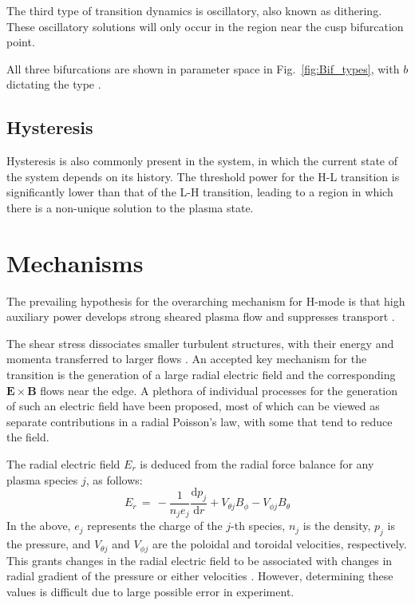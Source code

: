 The third type of transition dynamics is oscillatory, also known as dithering.
These oscillatory solutions will only occur in the region near the cusp bifurcation point.

All three bifurcations are shown in parameter space in Fig.~\ref{fig:Bif_types}, with $b$ dictating the type \cite{weymiens_bifurcation_2014}.

\subsection{Hysteresis}
Hysteresis is also commonly present in the system, in which the current state of the system depends on its history.
The threshold power for the H-L transition is significantly lower than that of the L-H transition, leading to a region in which there is a non-unique solution to the plasma state.


\section{Mechanisms}
The prevailing hypothesis for the overarching mechanism for H-mode is that high auxiliary power develops strong sheared plasma flow and suppresses transport \cite{freidberg_plasma_2007}.

The shear stress dissociates smaller turbulent structures, with their energy and momenta transferred to larger flows \cite{staps_backstepping_2017}.
An accepted key mechanism for the transition is the generation of a large radial electric field and the corresponding $\mathbf{E}\times\mathbf{B}$ flows near the edge.
A plethora of individual processes for the generation of such an electric field have been proposed, most of which can be viewed as separate contributions in a radial Poisson's law, with some that tend to reduce the field.

The radial electric field $E_r$ is deduced from the radial force balance for any plasma species $j$, as follows:
\begin{equation}
	E_r \,=\, -\frac{1}{n_j e_j} \frac{\text{d} p_j}{\text{d} r} + V_{\theta j} B_\phi - V_{\phi j} B_\theta
	\label{eq:E_r}
\end{equation}
In the above, $e_j$ represents the charge of the $j$-th species, $n_j$ is the density, $p_j$ is the pressure, and $V_{\theta j}$ and $V_{\phi j}$ are the poloidal and toroidal velocities, respectively.
This grants changes in the radial electric field to be associated with changes in radial gradient of the pressure or either velocities \cite{connor_review_2000}\cite{staps_backstepping_2017}.
However, determining these values is difficult due to large possible error in experiment.


